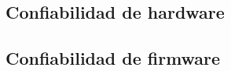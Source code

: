\documentclass[../../main.tex]{subfiles}
\begin{document}
\subsection{Confiabilidad de hardware}\label{subsec:conf_hw}


\subsection{Confiabilidad de firmware}\label{subsec:conf_fw}

\end{document}

